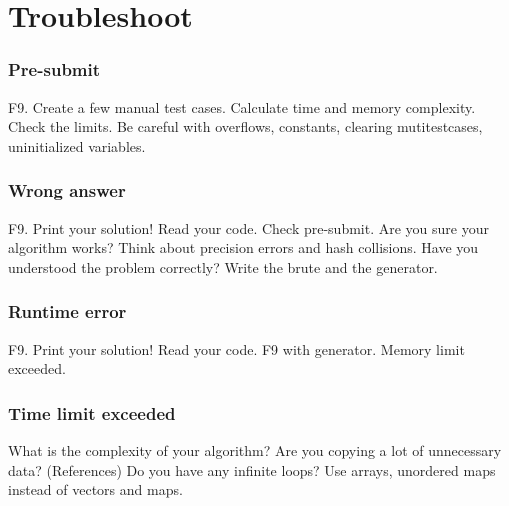 \section{Troubleshoot}
\subsubsection{Pre-submit}
F9.
Create a few manual test cases.
Calculate time and memory complexity. Check the limits.
Be careful with overflows, constants,
clearing mutitestcases, uninitialized variables.

\subsubsection{Wrong answer}
F9.
Print your solution!
Read your code.
Check pre-submit.
Are you sure your algorithm works?
Think about precision errors and hash collisions.
Have you understood the problem correctly?
Write the brute and the generator.

\subsubsection{Runtime error}
F9.
Print your solution!
Read your code.
F9 with generator.
Memory limit exceeded.

\subsubsection{Time limit exceeded}
What is the complexity of your algorithm?
Are you copying a lot of unnecessary data? (References)
Do you have any infinite loops?
Use arrays, unordered maps instead of vectors and maps.
